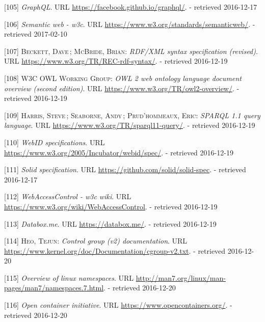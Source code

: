 \documentclass[12pt,english,a4paper,titlepage,cleardoublepage=empty,dottedtoc]{report}
\begin{document}
\hypertarget{ref-web_spec_graphql}{}
{[}105{]} \emph{GraphQL}. URL \url{https://facebook.github.io/graphql/}.
- retrieved 2016-12-17

\hypertarget{ref-web_2016_w3c_semantic-web-activity}{}
{[}106{]} \emph{Semantic web - w3c}. URL
\url{https://www.w3.org/standards/semanticweb/}. - retrieved 2017-02-10

\hypertarget{ref-web_w3c-tr_rdf}{}
{[}107{]} \textsc{Beckett, Dave}\,; \textsc{McBride, Brian}:
\emph{RDF/XML syntax specification (revised)}. URL
\url{https://www.w3.org/TR/REC-rdf-syntax/}. - retrieved 2016-12-19

\hypertarget{ref-web_w3c-tr_owl}{}
{[}108{]} \textsc{W3C OWL Working Group}: \emph{OWL 2 web ontology
language document overview (second edition)}. URL
\url{https://www.w3.org/TR/owl2-overview/}. - retrieved 2016-12-19

\hypertarget{ref-web_w3c-tr_sparql}{}
{[}109{]} \textsc{Harris, Steve}\,; \textsc{Seaborne, Andy}\,;
\textsc{Prud'hommeaux, Eric}: \emph{SPARQL 1.1 query language}. URL
\url{https://www.w3.org/TR/sparql11-query/}. - retrieved 2016-12-19

\hypertarget{ref-web_w3c-draft_webid}{}
{[}110{]} \emph{WebID specifications}. URL
\url{https://www.w3.org/2005/Incubator/webid/spec/}. - retrieved
2016-12-19

\hypertarget{ref-web_spec_solid}{}
{[}111{]} \emph{Solid specification}. URL
\url{https://github.com/solid/solid-spec}. - retrieved 2016-12-17

\hypertarget{ref-web_2016_wiki_webaccesscontrol}{}
{[}112{]} \emph{WebAccessControl - w3c wiki}. URL
\url{https://www.w3.org/wiki/WebAccessControl}. - retrieved 2016-12-19

\hypertarget{ref-web_2016_demo_databox}{}
{[}113{]} \emph{Databox.me}. URL \url{https://databox.me/}. - retrieved
2016-12-19

\hypertarget{ref-web_2015_cgroup-doc}{}
{[}114{]} \textsc{Heo, Tejun}: \emph{Control group (v2) documentation}.
URL \url{https://www.kernel.org/doc/Documentation/cgroup-v2.txt}. -
retrieved 2016-12-20

\hypertarget{ref-web_2016_kernel-namespace}{}
{[}115{]} \emph{Overview of linux namespaces}. URL
\url{http://man7.org/linux/man-pages/man7/namespaces.7.html}. -
retrieved 2016-12-20

\hypertarget{ref-web_2016_open-container-initiative}{}
{[}116{]} \emph{Open container initiative}. URL
\url{https://www.opencontainers.org/}. - retrieved 2016-12-20
\end{document}
